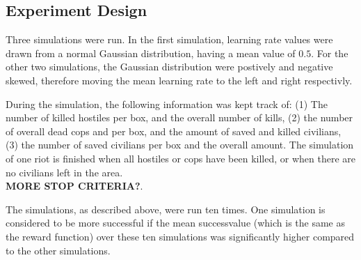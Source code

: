\subsection{Experiment Design}
Three simulations were run. In the first simulation, learning rate values were drawn from a normal Gaussian distribution, having a mean value of $0.5$. For the other two simulations, the Gaussian distribution were postively and negative skewed, therefore moving the mean learning rate to the left and right respectivly. 

During the simulation, the following information was kept track of: (1) The number of killed hostiles per box, and the overall number of kills, (2) the number of overall dead cops and per box, and the amount of saved and killed civilians, (3) the number of saved civilians per box and the overall amount. The simulation of one riot is finished when all hostiles or cops have been killed, or when there are no civilians left in the area. \\ \textbf{MORE STOP CRITERIA?}. 
 
The simulations, as described above, were run ten times. One simulation is considered to be more successful if the mean successvalue (which is the same as the reward function) over these ten simulations was significantly higher compared to the other simulations. 